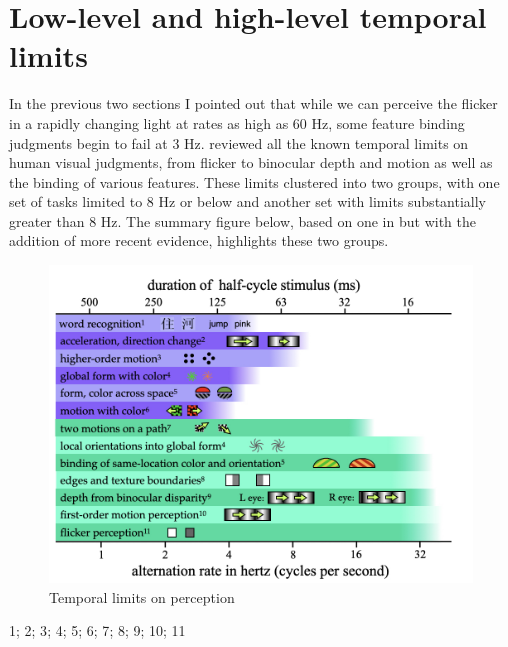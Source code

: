\documentclass[
]{book}
\begin{document}
\hypertarget{loHighLevelLims}{%
\section{Low-level and high-level temporal limits}\label{loHighLevelLims}}

In the previous two sections I pointed out that while we can perceive the flicker in a rapidly changing light at rates as high as 60 Hz, some feature binding judgments begin to fail at 3 Hz. \citet{holcombeSeeingSlowSeeing2009} reviewed all the known temporal limits on human visual judgments, from flicker to binocular depth and motion as well as the binding of various features. These limits clustered into two groups, with one set of tasks limited to 8 Hz or below and another set with limits substantially greater than 8 Hz. The summary figure below, based on one in \citet{holcombeSeeingSlowSeeing2009} but with the addition of more recent evidence, highlights these two groups.

\begin{figure}
\includegraphics[width=1\linewidth]{imagesForRmd/temporalLimitsPerception/temporalLimits.001} \caption{Temporal limits on perception}\label{fig:temporalLims}
\end{figure}

1\citet{holcombeVisualBindingEnglish2007};
2\citet{werkhovenVisualProcessingOptic1992};
3\citet{verstratenLimitsAttentiveTracking2000};
4\citet{cliffordRapidGlobalForm2004};
5\citet{holcombeEarlyBindingFeature2001};
6\citet{arnoldPerceptualPairingColour2005};
7\citet{maruyaRapidEncodingRelationships2013};
8\citet{rogers-ramachandranPsychophysicalEvidenceBoundary1998};
9\citet{morganStereoscopicDepthPerception1995a};
10\citet{burrContrastSensitivityHigh1982};
11\citet{vonsegnerRaritaeLuminis1740}
\end{document}
